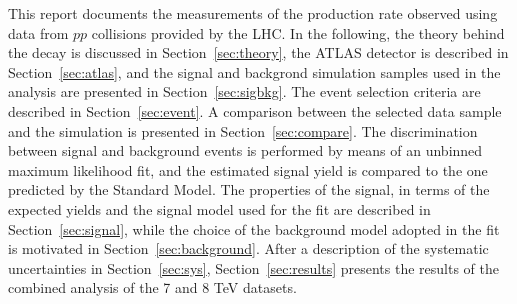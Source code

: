 This report documents the measurements of the \HToZg production rate observed
using data from $pp$ collisions provided by the LHC. In the following, the
theory behind the \HToZg decay is discussed in Section~\ref{sec:theory},
the ATLAS detector is described in Section~\ref{sec:atlas}, and the signal
and backgrond simulation samples used in the analysis are presented in
Section~\ref{sec:sigbkg}. The event selection criteria are described in 
Section~\ref{sec:event}. A comparison between the selected data sample and
the simulation is presented in Section~\ref{sec:compare}. The discrimination
between signal and background events is performed by means of an unbinned
maximum likelihood fit, and the estimated signal yield is compared to the one 
predicted by the Standard Model. The properties of the signal, in terms of
the expected yields and the signal model used for the fit are described
in Section~\ref{sec:signal}, while the choice of the background model adopted
in the fit is motivated in Section~\ref{sec:background}. After a description of
the systematic uncertainties in Section~\ref{sec:sys}, Section~\ref{sec:results}
presents the results of the combined analysis of the 7 and 8 TeV datasets.
